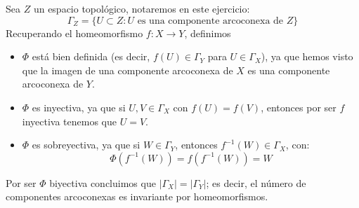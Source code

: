 \begin{ejercicio}
    \noindent
    Sea $Z$ un espacio topológico, notaremos en este ejercicio:
    \begin{equation*}
        \Gamma_Z = \{U\subset Z : U \text{\ es una componente arcoconexa de\ } Z\}
    \end{equation*}
    Recuperando el homeomorfismo $f:X\to Y$, definimos
    \begin{itemize}
        \item $\Phi$ está bien definida (es decir, $f(U)\in \Gamma_Y$ para $U\in \Gamma_X$), ya que hemos visto que la imagen de una componente arcoconexa de $X$ es una componente arcoconexa de $Y$.
        \item $\Phi$ es inyectiva, ya que si $U,V\in \Gamma_X$ con $f(U)=f(V)$, entonces por ser $f$ inyectiva tenemos que $U=V$.
        \item $\Phi$ es sobreyectiva, ya que si $W\in \Gamma_Y$, entonces $f^{-1}(W)\in \Gamma_X$, con:
            \begin{equation*}
                \Phi(f^{-1}(W)) = f(f^{-1}(W)) = W
            \end{equation*}
    \end{itemize}
    Por ser $\Phi$ biyectiva concluimos que $|\Gamma_X| = |\Gamma_Y|$; es decir, el número de componentes arcoconexas es invariante por homeomorfismos.
\end{ejercicio}

